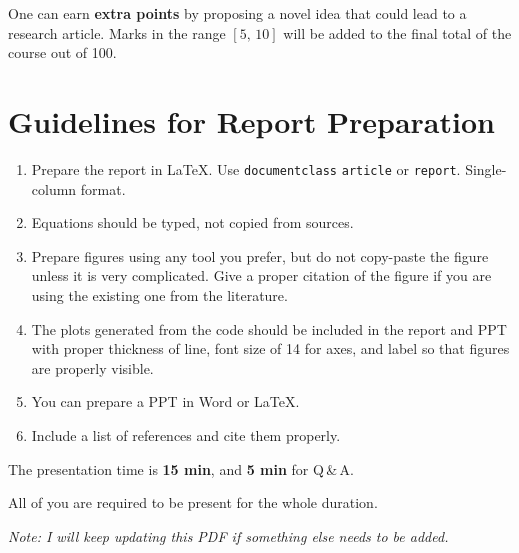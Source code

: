 \documentclass[12pt, a4paper]{article}
\begin{document}
\vspace{0.5em}

One can earn \textbf{extra points} by proposing a novel idea that could lead to a
research article. Marks in the range $[5,\,10]$ will be added to the final total of
the course out of 100.

\newpage

\section*{Guidelines for Report Preparation}

\begin{enumerate}[leftmargin=1.5em]
    \item Prepare the report in \LaTeX{}. Use \texttt{documentclass} \texttt{article} or \texttt{report}. Single-column format.

    \item Equations should be typed, not copied from sources.

    \item Prepare figures using any tool you prefer, but do not copy-paste the figure unless it
    is very complicated. Give a proper citation of the figure if you are using the existing
    one from the literature.

    \item The plots generated from the code should be included in the report and PPT with
    proper thickness of line, font size of 14 for axes, and label so that figures are properly
    visible.

    \item You can prepare a PPT in Word or \LaTeX{}.

    \item Include a list of references and cite them properly.
\end{enumerate}

The presentation time is \textbf{15 min}, and \textbf{5 min} for Q\,\&\,A.

All of you are required to be present for the whole duration.

\vspace{1em}
\noindent\textit{Note: I will keep updating this PDF if something else needs to be added.}
\end{document}
